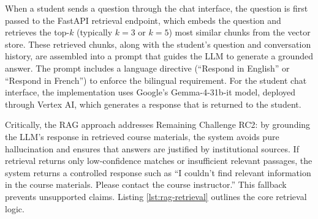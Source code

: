 \documentclass[a4paper,9pt,twocolumn]{extarticle}
\begin{document}
When a student sends a question through the chat interface, the question is first passed to the FastAPI retrieval endpoint, which embeds the question and retrieves the top-$k$ (typically $k=3$ or $k=5$) most similar chunks from the vector store. These retrieved chunks, along with the student's question and conversation history, are assembled into a prompt that guides the LLM to generate a grounded answer. The prompt includes a language directive (``Respond in English'' or ``Respond in French'') to enforce the bilingual requirement. For the student chat interface, the implementation uses Google's Gemma-4-31b-it model, deployed through Vertex AI, which generates a response that is returned to the student.

Critically, the RAG approach addresses Remaining Challenge RC2: by grounding the LLM's response in retrieved course materials, the system avoids pure hallucination and ensures that answers are justified by institutional sources. If retrieval returns only low-confidence matches or insufficient relevant passages, the system returns a controlled response such as ``I couldn't find relevant information in the course materials. Please contact the course instructor.'' This fallback prevents unsupported claims. Listing \ref{lst:rag-retrieval} outlines the core retrieval logic.
\end{document}
